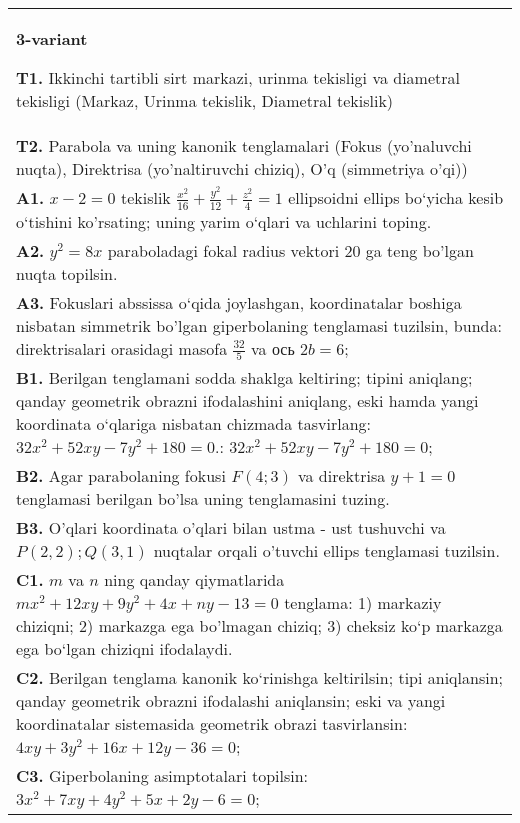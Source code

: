 \documentclass{article}
\begin{document}
\begin{tabular}{m{17cm}}
\textbf{3-variant}
\newline

\textbf{T1.} Ikkinchi tartibli sirt markazi, urinma tekisligi va diametral tekisligi (Markaz, Urinma tekislik, Diametral tekislik) \\
\textbf{T2.} Parabola va uning kanonik tenglamalari (Fokus (yo’naluvchi nuqta), Direktrisa (yo’naltiruvchi chiziq), O’q (simmetriya o’qi)) \\
\textbf{A1.} $x-2=0$ tekislik $\frac{x^2}{16}+\frac{y^2}{12}+\frac{z^2}{4}=1$ ellipsoidni ellips bo‘yicha kesib o‘tishini ko'rsating; uning yarim o‘qlari va uchlarini toping. \\
\textbf{A2.} $y^2=8 x$ paraboladagi fokal radius vektori 20 ga teng bo'lgan nuqta topilsin. \\
\textbf{A3.} Fokuslari abssissa o‘qida joylashgan, koordinatalar boshiga nisbatan simmetrik bo'lgan giperbolaning tenglamasi tuzilsin, bunda: direktrisalari orasidagi masofa $\frac{32}{5}$ va ось $2 b=6$; \\
\textbf{B1.} Berilgan tenglamani sodda shaklga keltiring; tipini aniqlang; qanday geometrik obrazni ifodalashini aniqlang, eski hamda yangi koordinata o‘qlariga nisbatan chizmada tasvirlang: $32x^2+52xy-7y^2+180=0$.: $32 x^2+52 x y-7 y^2+180=0$; \\
\textbf{B2.} Agar parabolaning fokusi $F (4;3) $ va direktrisa $y+1=0$ tenglamasi berilgan bo'lsa uning tenglamasini tuzing. \\
\textbf{B3.} O'qlari koordinata o'qlari bilan ustma - ust tushuvchi va $P(2,2) ; Q(3,1)$ nuqtalar orqali o'tuvchi ellips tenglamasi tuzilsin. \\
\textbf{C1.} $m$ va $n$ ning qanday qiymatlarida $m x^2+12 x y+9 y^2+4 x+n y-13=0$ tenglama: 1) markaziy chiziqni; 2) markazga ega bo'lmagan chiziq; 3) cheksiz ko‘p markazga ega bo‘lgan chiziqni ifodalaydi. \\
\textbf{C2.} Berilgan tenglama kanonik ko‘rinishga keltirilsin; tipi aniqlansin; qanday geometrik obrazni ifodalashi aniqlansin; eski va yangi koordinatalar sistemasida geometrik obrazi tasvirlansin: $4 x y+3 y^2+16 x+12 y-36=0$; \\
\textbf{C3.} Giperbolaning asimptotalari topilsin: $3 x^2+7 x y+4 y^2+5 x+2 y-6=0$; \\

\end{tabular}
\vspace{1cm}
\end{document}
